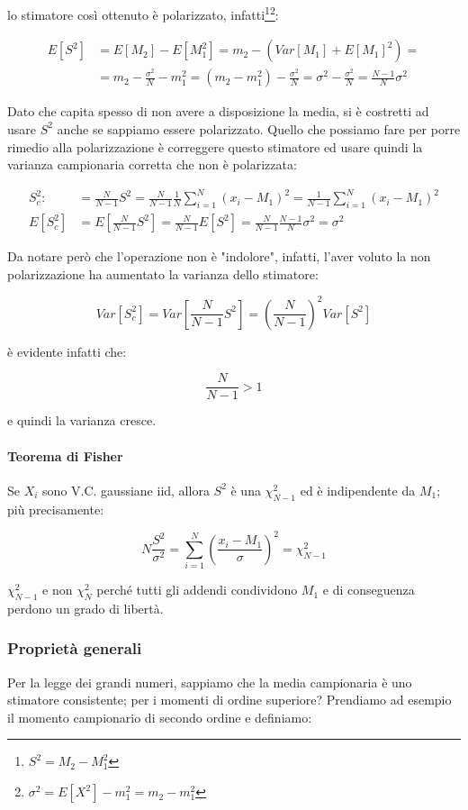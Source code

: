 lo stimatore così ottenuto è polarizzato, infatti\footnote{$S^2=M_2-M_1^2$}\footnote{$\sigma^2=E[X^2]-m_1^2=m_2-m_1^2$}:

    \[ 
      \begin{split}
        E[S^2] &=E[M_2]-E[M_1^2]=m_2-\left( Var[M_1]+E[M_1]^2 \right) =\\ 
        &=m_2 -\frac{\sigma^2}{N}-m_1^2=(m_2-m_1^2)-\frac{\sigma^2}{N}=\sigma^2-\frac{\sigma^2}{N}=\frac{N-1}{N}\sigma^2
      \end{split} 
    \]

Dato che capita spesso di non avere a disposizione la media, si è costretti ad usare $S^2$ anche se sappiamo essere polarizzato. Quello che possiamo fare per porre rimedio alla polarizzazione è correggere questo stimatore ed usare quindi la varianza campionaria corretta  che non è polarizzata:
  
  \begin{align*}
      S_c^2:&=\frac{N}{N-1}S^2=\frac{N}{N-1}\frac{1}{N}\sum_{i=1}^{N}{(x_i-M_1)^2}=\frac{1}{N-1}\sum_{i=1}^{N}{(x_i-M_1)^2} \\
    E[S_c^2]&=E[\frac{N}{N-1}S^2]=\frac{N}{N-1}E[S^2]=\frac{N}{N-1}\frac{N-1}{N}\sigma^2=\sigma^2
  \end{align*}
  
Da notare però che l'operazione non è "indolore", infatti, l'aver voluto la non polarizzazione ha aumentato la varianza dello stimatore:

    \[ Var[S_c^2]=Var[\frac{N}{N-1}S^2]=\left(\frac{N}{N-1}\right)^2Var[S^2] \]

è evidente infatti che:

    \[ \frac{N}{N-1}>1 \]

e quindi la varianza cresce.

\paragraph{Teorema di Fisher}  Se $X_i$ sono V.C. gaussiane iid, allora $S^2$ è una $\chi_{N-1}^2$ ed è indipendente da $M_1$; più precisamente:

    \[ N\frac{S^2}{\sigma^2}=\sum_{i=1}^{N}{\left( \frac{x_i-M_1}{\sigma}\right)^2}=\chi_{N-1}^2 \]

$\chi_{N-1}^2$ e non $\chi_N^2$ perché tutti gli addendi condividono $M_1$ e di conseguenza perdono un grado di libertà.

\subsubsection{Proprietà generali}
Per la legge dei grandi numeri, sappiamo che la media campionaria è uno stimatore consistente; per i momenti di ordine superiore? Prendiamo ad esempio il momento campionario di secondo ordine e definiamo:

